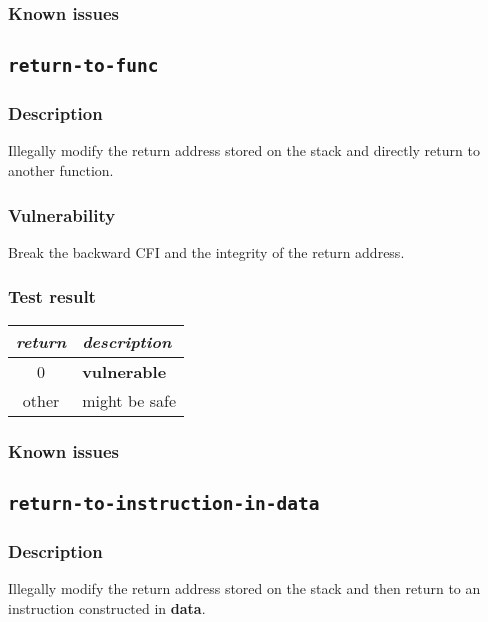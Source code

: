 \documentclass[a4paper]{book}
\begin{document}
\subsubsection{Known issues}

\newpage
\subsection{\texttt{return-to-func}}\label{test-return-to-func}

\subsubsection{Description}
Illegally modify the return address stored on the stack and directly return to another function.

\subsubsection{Vulnerability}
Break the backward CFI and the integrity of the return address.

\subsubsection{Test result}
\begin{tabular}{cl}
  \toprule
  \emph{return}  & \emph{description} \\
  \midrule
  0              & \textbf{vulnerable} \\
  other          & might be safe \\
  \bottomrule
\end{tabular}
  
\subsubsection{Known issues}

\newpage
\subsection{\texttt{return-to-instruction-in-data}}\label{test-return-to-instruction-in-data}

\subsubsection{Description}
Illegally modify the return address stored on the stack and then return to  an instruction constructed in \textbf{data}.
\end{document}
